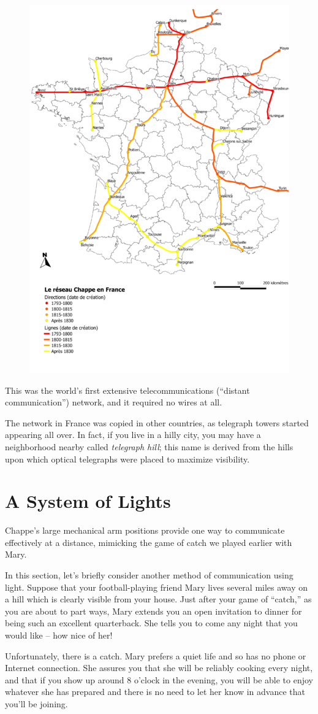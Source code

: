 \documentclass[UTF8]{book}
\begin{document}
\begin{CJK}{UTF8}{gbsn}
\begin{figure}[H]
\centering
\includegraphics[width=0.5\linewidth]{chappe_network}
\end{figure}

This was the world's first extensive telecommunications (``distant communication'') network, and it required no wires at all.

The network in France was copied in other countries, as telegraph towers started appearing all over. In fact, if you live in a hilly city, you may have a neighborhood nearby called \emph{telegraph hill}; this name is derived from the hills upon which optical telegraphs were placed to maximize visibility.

\section{A System of Lights}

Chappe's large mechanical arm positions provide one way to communicate effectively at a distance, mimicking the game of catch we played earlier with Mary.

In this section, let's briefly consider another method of communication using light. Suppose that your football-playing friend Mary lives several miles away on a hill which is clearly visible from your house. Just after your game of ``catch,'' as you are about to part ways, Mary extends you an open invitation to dinner for being such an excellent quarterback. She tells you to come any night that you would like -- how nice of her!

Unfortunately, there is a catch. Mary prefers a quiet life and so has no phone or Internet connection. She assures you that she will be reliably cooking every night, and that if you show up around 8 o'clock in the evening, you will be able to enjoy whatever she has prepared and there is no need to let her know in advance that you'll be joining.


\end{CJK}
\end{document}
